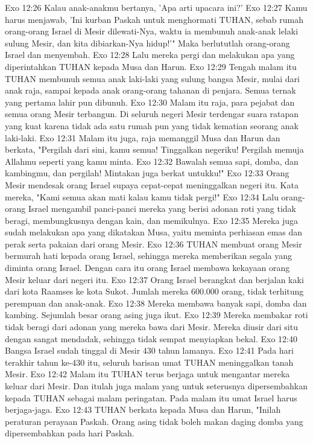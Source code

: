 Exo 12:26  Kalau anak-anakmu bertanya, 'Apa arti upacara ini?'
Exo 12:27  Kamu harus menjawab, 'Ini kurban Paskah untuk menghormati TUHAN, sebab rumah orang-orang Israel di Mesir dilewati-Nya, waktu ia membunuh anak-anak lelaki sulung Mesir, dan kita dibiarkan-Nya hidup!'" Maka berlututlah orang-orang Israel dan menyembah.
Exo 12:28  Lalu mereka pergi dan melakukan apa yang diperintahkan TUHAN kepada Musa dan Harun.
Exo 12:29  Tengah malam itu TUHAN membunuh semua anak laki-laki yang sulung bangsa Mesir, mulai dari anak raja, sampai kepada anak orang-orang tahanan di penjara. Semua ternak yang pertama lahir pun dibunuh.
Exo 12:30  Malam itu raja, para pejabat dan semua orang Mesir terbangun. Di seluruh negeri Mesir terdengar suara ratapan yang kuat karena tidak ada satu rumah pun yang tidak kematian seorang anak laki-laki.
Exo 12:31  Malam itu juga, raja memanggil Musa dan Harun dan berkata, "Pergilah dari sini, kamu semua! Tinggalkan negeriku! Pergilah memuja Allahmu seperti yang kamu minta.
Exo 12:32  Bawalah semua sapi, domba, dan kambingmu, dan pergilah! Mintakan juga berkat untukku!"
Exo 12:33  Orang Mesir mendesak orang Israel supaya cepat-cepat meninggalkan negeri itu. Kata mereka, "Kami semua akan mati kalau kamu tidak pergi!"
Exo 12:34  Lalu orang-orang Israel mengambil panci-panci mereka yang berisi adonan roti yang tidak beragi, membungkusnya dengan kain, dan memikulnya.
Exo 12:35  Mereka juga sudah melakukan apa yang dikatakan Musa, yaitu meminta perhiasan emas dan perak serta pakaian dari orang Mesir.
Exo 12:36  TUHAN membuat orang Mesir bermurah hati kepada orang Israel, sehingga mereka memberikan segala yang diminta orang Israel. Dengan cara itu orang Israel membawa kekayaan orang Mesir keluar dari negeri itu.
Exo 12:37  Orang Israel berangkat dan berjalan kaki dari kota Raamses ke kota Sukot. Jumlah mereka 600.000 orang, tidak terhitung perempuan dan anak-anak.
Exo 12:38  Mereka membawa banyak sapi, domba dan kambing. Sejumlah besar orang asing juga ikut.
Exo 12:39  Mereka membakar roti tidak beragi dari adonan yang mereka bawa dari Mesir. Mereka diusir dari situ dengan sangat mendadak, sehingga tidak sempat menyiapkan bekal.
Exo 12:40  Bangsa Israel sudah tinggal di Mesir 430 tahun lamanya.
Exo 12:41  Pada hari terakhir tahun ke-430 itu, seluruh barisan umat TUHAN meninggalkan tanah Mesir.
Exo 12:42  Malam itu TUHAN terus berjaga untuk mengantar mereka keluar dari Mesir. Dan itulah juga malam yang untuk seterusnya dipersembahkan kepada TUHAN sebagai malam peringatan. Pada malam itu umat Israel harus berjaga-jaga.
Exo 12:43  TUHAN berkata kepada Musa dan Harun, "Inilah peraturan perayaan Paskah. Orang asing tidak boleh makan daging domba yang dipersembahkan pada hari Paskah.
